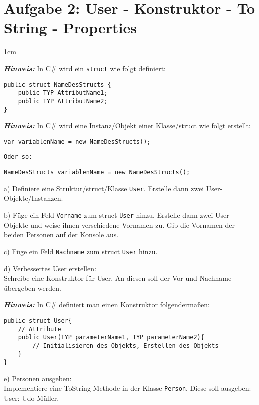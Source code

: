 \documentclass[12pt]{article}
\newenvironment{aufgabe}[2]
  {%
   \section*{Aufgabe #1: #2}
   \vspace{0.5em}
   \begin{adjustwidth}{1cm}{}  %
  }
  {%
   \end{adjustwidth}
  }
\newcommand{\subaufgabe}[1]{
    #1
}
\newcommand{\hint}[1]{
    \vspace{0.5em}
    \textbf{\textit{Hinweis:}} #1
    \vspace{0.5em}
}
\begin{document}
\begin{aufgabe}{2}{User - Konstruktor - To String - Properties}
\hint{In C\# wird ein \texttt{struct} wie folgt definiert:}
\begin{lstlisting}
public struct NameDesStructs {
    public TYP AttributName1;
    public TYP AttributName2;
}
\end{lstlisting}
\hint{In C\# wird eine Instanz/Objekt einer Klasse/struct wie folgt erstellt:}
\begin{lstlisting}
var variablenName = new NameDesStructs();
\end{lstlisting}
\texttt{Oder so:}
\begin{lstlisting}
NameDesStructs variablenName = new NameDesStructs();
\end{lstlisting}
\subaufgabe{a)
Definiere eine Struktur/struct/Klasse \texttt{User}. Erstelle dann zwei User-Objekte/Instanzen.}

\subaufgabe{b) Füge ein Feld \texttt{Vorname} zum struct \texttt{User} hinzu. Erstelle dann zwei User Objekte und weise ihnen verschiedene Vornamen zu. Gib die Vornamen der beiden Personen auf der Konsole aus.}

\subaufgabe{c) Füge ein Feld \texttt{Nachname} zum struct \texttt{User} hinzu.}


\subaufgabe{d) Verbessertes User erstellen: \\
Schreibe eine Konstruktor für User. An diesen soll der Vor und Nachname übergeben werden.
}

\hint{In C\# definiert man einen Konstruktor folgendermaßen:}
\begin{lstlisting}
public struct User{
    // Attribute
    public User(TYP parameterName1, TYP parameterName2){
        // Initialisieren des Objekts, Erstellen des Objekts
    }
}
\end{lstlisting}

\subaufgabe{e) Personen ausgeben: \\
Implementiere eine ToString Methode in der Klasse \texttt{Person}. Diese soll ausgeben: User: Udo Müller.
}


\end{aufgabe}
\end{document}
